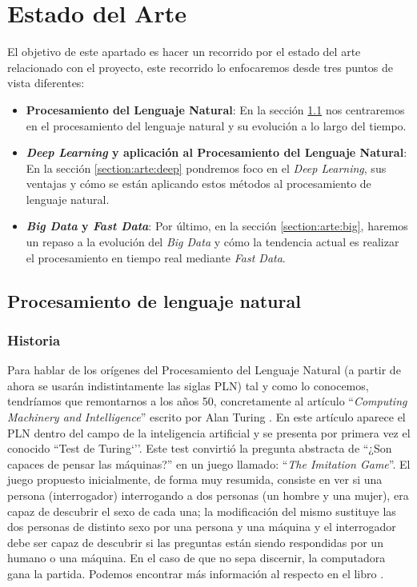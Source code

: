 \chapter{Estado del Arte}
\label{chapter:estadoarte}


El objetivo de este apartado es hacer un recorrido por el estado del arte relacionado con el proyecto, este recorrido lo enfocaremos desde tres puntos de vista diferentes:
\begin{itemize}
	\item \textbf{Procesamiento del Lenguaje Natural}: En la sección \ref{section:arte:pln}  nos centraremos en el procesamiento del lenguaje natural y su evolución a lo largo del tiempo. 
	\item \textbf{\textit{Deep Learning} y aplicación al Procesamiento del Lenguaje Natural}: En la sección \ref{section:arte:deep}  pondremos foco en el \textit{Deep Learning}, sus ventajas y cómo se están aplicando estos métodos al procesamiento de lenguaje natural. 
	\item \textbf{\textit{Big Data} y \textit{Fast Data}}: Por último, en la sección \ref{section:arte:big}, haremos un repaso a la evolución del \textit{Big Data} y cómo la tendencia actual es realizar el procesamiento en tiempo real mediante \textit{Fast Data}.
\end{itemize}

\section{Procesamiento de lenguaje natural}
\label{section:arte:pln}

\subsection{Historia}

Para hablar de los orígenes del Procesamiento del Lenguaje Natural (a partir de ahora se usarán indistintamente las siglas PLN) tal y como lo conocemos, tendríamos que remontarnos a los años 50, concretamente al artículo ``\textit{Computing Machinery and Intelligence}'' escrito por Alan Turing \cite{turing_1950}. En este artículo aparece el PLN dentro del campo de la inteligencia artificial y se presenta por primera vez el conocido ``Test de Turing`''. Este test convirtió la pregunta abstracta de ``¿Son capaces de pensar las máquinas?'' en un juego llamado: ``\textit{The Imitation Game}''. El juego propuesto inicialmente, de forma muy resumida, consiste en ver si una persona (interrogador) interrogando a dos personas (un hombre y una mujer), era capaz de descubrir el sexo de cada una; la modificación del mismo sustituye las dos personas de distinto sexo por una persona y una máquina y el interrogador debe ser capaz de descubrir si las preguntas están siendo respondidas por un humano o una máquina. En el caso de que no sepa discernir, la computadora gana la partida. Podemos encontrar más información al respecto en el libro \cite{turing}.



